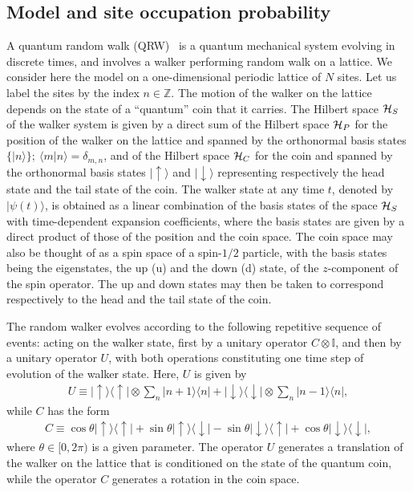 \documentclass[12pt]{iopart}
\def\uarr{\uparrow}
\def\darr{\downarrow}
\def\la{\langle}
\def\ra{\rangle}
\begin{document}
\subsection{Model and site occupation probability}
\label{sec:QRW1}
A quantum random
walk (QRW)~\cite{qua-Aharonov:1993,qua-Vishwanath:2000,qua-Kempe:2003}
is a quantum
mechanical system evolving in discrete times, and involves a walker
performing random walk on a lattice. We consider here the model on a one-dimensional periodic lattice of $N$
sites. Let us label the sites by the index
$n \in \mathbb{Z}$. The motion of the walker on the
lattice depends on the state of a ``quantum'' coin that it carries. The
Hilbert space ${\cal H}_S$ of the walker system is given by a direct sum of the Hilbert space
${\cal H}_P$ for the position of the walker on the lattice and spanned by the
orthonormal basis states $\{|n\ra\};~\la m|n\ra=\delta_{m,n}$, and of the
Hilbert space ${\cal H}_C$ for the coin and spanned by the
orthonormal basis states $|\uarr\ra$ and $|\darr \ra$ representing respectively
the head state and the tail state of the coin. The walker state at any time
$t$, denoted by $|\psi(t)\ra$, is obtained as a linear combination of
the basis states of the space ${\cal H}_S$ with time-dependent expansion
coefficients, where the basis states are given by a direct
product of those of the position and the
coin space. The coin space may also be thought of as a spin space of a
spin-$1/2$ particle, with the basis states being the
eigenstates, the up (u) and the down (d) state, of the $z$-component of
the spin operator. The up and down states may then be taken to correspond respectively to the head and the tail state of the coin.

The random walker evolves according to the following
repetitive sequence of events: acting on the walker state, first by a
unitary operator $ C \otimes \mathbb{I}$, and then by a unitary operator $U$, with both
operations constituting one time step of evolution of the walker state.
Here, $U$ is given by 
\begin{align}
U\equiv|\uarr\ra \la \uarr | \otimes \sum_n |n+1\ra \la n|+|\darr\ra \la \darr |
\otimes \sum_n |n-1\ra \la n|,
\label{eq:qua-U-definition}
\end{align}
while $C$ has the form
\begin{align}
        C \equiv \cos \theta|\uarr\ra\la\uarr| +\sin \theta|\uarr\ra\la\darr| -\sin\theta|\darr\ra\la\uarr|+\cos \theta|\darr\ra\la\darr| ,
\label{eq:qua-Hadamard-definition}
\end{align}
where $\theta \in [0,2\pi)$ is a given parameter. The operator $U$ generates a translation of the
walker on the lattice that is conditioned on the state of the quantum
coin, while the operator $C$ generates a rotation in the coin space.
\end{document}
